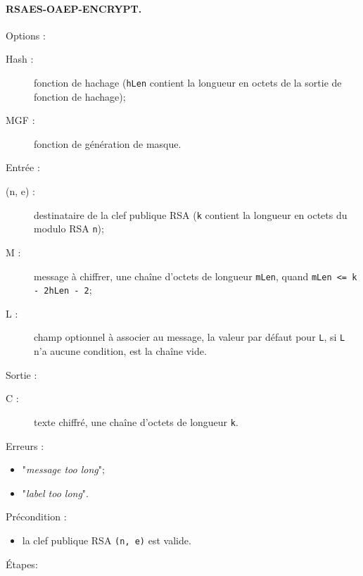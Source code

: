 \paragraph{RSAES-OAEP-ENCRYPT. \\}
Options :
\begin{description}
\item [Hash :] fonction de hachage (\texttt{hLen} contient la longueur en octets de la sortie de fonction de hachage);
\item [MGF :] fonction de génération de masque.\\
\end{description}
Entrée :
\begin{description}
\item [(n, e) : ] destinataire de la clef publique RSA (\texttt{k} contient la longueur en octets du modulo RSA \texttt{n});
\item [M : ] message à chiffrer, une chaîne d'octets de longueur \texttt{mLen}, quand \texttt{mLen <= k - 2hLen - 2};
\item [L : ] champ optionnel à associer au message, la valeur par défaut pour \texttt{L}, si \texttt{L} n'a aucune condition, est la chaîne vide.\\
\end{description}
Sortie :
\begin{description}
\item [C : ] texte chiffré, une chaîne d'octets de longueur \texttt{k}.\\
\end{description}
Erreurs :
\begin{itemize}
\item "\textit{message too long}";
\item "\textit{label too long}".\\
\end{itemize}
Précondition :
\begin{itemize}
\item la clef publique RSA \texttt{(n, e)} est valide.\\
\end{itemize}
Étapes:
